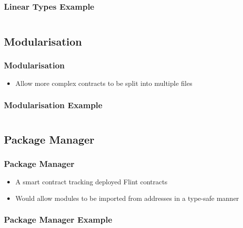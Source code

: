 \documentclass[aspectratio=169]{beamer}
\begin{document}
\begin{frame}
\frametitle{Linear Types Example}
\inputminted{swift}{code/linear-types.flint}
\end{frame}

\subsection{Modularisation}

\begin{frame}
\frametitle{Modularisation}
\begin{itemize}
    \item Allow more complex contracts to be split into multiple files
\end{itemize}
\end{frame}

\begin{frame}
\frametitle{Modularisation Example}
\inputminted{swift}{code/modularisation.flint}
\end{frame}

\subsection{Package Manager}

\begin{frame}
\frametitle{Package Manager}
\begin{itemize}
    \item A smart contract tracking deployed Flint contracts
    \item Would allow modules to be imported from addresses in a type-safe manner
\end{itemize}
\end{frame}

\begin{frame}
\frametitle{Package Manager Example}
\inputminted{swift}{code/fpm.flint}
\end{frame}
\end{document}
